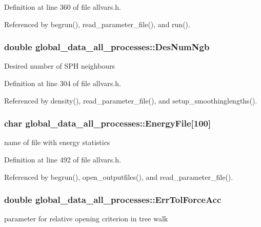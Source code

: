 Definition at line 360 of file allvars.h.



Referenced by begrun(), read\_\-parameter\_\-file(), and run().

\hypertarget{structglobal__data__all__processes_accb74aa1ccf3fb13e31f5704bb692313}{
\subsubsection[{DesNumNgb}]{\setlength{\rightskip}{0pt plus 5cm}double {\bf global\_\-data\_\-all\_\-processes::DesNumNgb}}}
\label{structglobal__data__all__processes_accb74aa1ccf3fb13e31f5704bb692313}
Desired number of SPH neighbours 

Definition at line 304 of file allvars.h.



Referenced by density(), read\_\-parameter\_\-file(), and setup\_\-smoothinglengths().

\hypertarget{structglobal__data__all__processes_aa97394ab3a522c46b75f8b57a59ca0b5}{
\subsubsection[{EnergyFile}]{\setlength{\rightskip}{0pt plus 5cm}char {\bf global\_\-data\_\-all\_\-processes::EnergyFile}\mbox{[}100\mbox{]}}}
\label{structglobal__data__all__processes_aa97394ab3a522c46b75f8b57a59ca0b5}
name of file with energy statistics 

Definition at line 492 of file allvars.h.



Referenced by begrun(), open\_\-outputfiles(), and read\_\-parameter\_\-file().

\hypertarget{structglobal__data__all__processes_a5a8eb914026679a7c816a09c20d25de0}{
\subsubsection[{ErrTolForceAcc}]{\setlength{\rightskip}{0pt plus 5cm}double {\bf global\_\-data\_\-all\_\-processes::ErrTolForceAcc}}}
\label{structglobal__data__all__processes_a5a8eb914026679a7c816a09c20d25de0}
parameter for relative opening criterion in tree walk 

